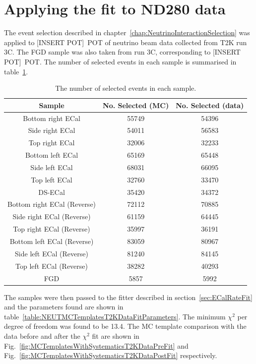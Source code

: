\section{Applying the fit to ND280 data}
\label{sec:ND280DataFit}
The event selection described in chapter~\ref{chap:NeutrinoInteractionSelection} was applied to [INSERT POT]~POT of neutrino beam data collected from T2K run 3C.  The FGD sample was also taken from run 3C, corresponding to [INSERT POT]~POT.  The number of selected events in each sample is summarised in table~\ref{table:NSelectedEventsMCDataAllSamples}.
\begin{table}
  \begin{tabular}{c c c}
    Sample & No. Selected (MC) & No. Selected (data) \\ \hline \hline
   Bottom right ECal & 55749 & 54396 \\
   Side right ECal & 54011 & 56583 \\
   Top right ECal & 32006 & 32233 \\
   Bottom left ECal & 65169 & 65448 \\
   Side left ECal & 68031 & 66095 \\
   Top left ECal & 32760 & 33470 \\
   DS-ECal & 35420 & 34372 \\
   Bottom right ECal (Reverse) & 72112 & 70885 \\
   Side right ECal (Reverse) & 61159 & 64445 \\
   Top right ECal (Reverse) & 35997 & 36191 \\
   Bottom left ECal (Reverse) & 83059 & 80967 \\
   Side left ECal (Reverse) & 81240 & 84145 \\
   Top left ECal (Reverse) & 38282 & 40293 \\
   FGD & 5857 & 5992 \\
  \end{tabular}
  \caption{The number of selected events in each sample.}
  \label{table:NSelectedEventsMCDataAllSamples}
\end{table}
\newline
\newline
The samples were then passed to the fitter described in section~\ref{sec:ECalRateFit} and the parameters found are shown in table~\ref{table:NEUTMCTemplatesT2KDataFitParameters}.  The minimum $\chi^2$ per degree of freedom was found to be 13.4.  The MC template comparison with the data before and after the $\chi^2$ fit are shown in Fig.~\ref{fig:MCTemplatesWithSystematicsT2KDataPreFit} and Fig.~\ref{fig:MCTemplatesWithSystematicsT2KDataPostFit} respectively.
